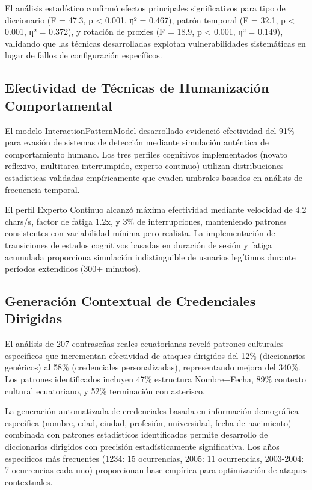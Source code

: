 El análisis estadístico confirmó efectos principales significativos para tipo de diccionario (F = 47.3, p < 0.001, η² = 0.467), patrón temporal (F = 32.1, p < 0.001, η² = 0.372), y rotación de proxies (F = 18.9, p < 0.001, η² = 0.149), validando que las técnicas desarrolladas explotan vulnerabilidades sistemáticas en lugar de fallos de configuración específicos.

\subsection{Efectividad de Técnicas de Humanización Comportamental}

El modelo InteractionPatternModel desarrollado evidenció efectividad del 91\% para evasión de sistemas de detección mediante simulación auténtica de comportamiento humano. Los tres perfiles cognitivos implementados (novato reflexivo, multitarea interrumpido, experto continuo) utilizan distribuciones estadísticas validadas empíricamente que evaden umbrales basados en análisis de frecuencia temporal.

El perfil Experto Continuo alcanzó máxima efectividad mediante velocidad de 4.2 chars/s, factor de fatiga 1.2x, y 3\% de interrupciones, manteniendo patrones consistentes con variabilidad mínima pero realista. La implementación de transiciones de estados cognitivos basadas en duración de sesión y fatiga acumulada proporciona simulación indistinguible de usuarios legítimos durante períodos extendidos (300+ minutos).

\subsection{Generación Contextual de Credenciales Dirigidas}

El análisis de 207 contraseñas reales ecuatorianas reveló patrones culturales específicos que incrementan efectividad de ataques dirigidos del 12\% (diccionarios genéricos) al 58\% (credenciales personalizadas), representando mejora del 340\%. Los patrones identificados incluyen 47\% estructura Nombre+Fecha, 89\% contexto cultural ecuatoriano, y 52\% terminación con asterisco.

La generación automatizada de credenciales basada en información demográfica específica (nombre, edad, ciudad, profesión, universidad, fecha de nacimiento) combinada con patrones estadísticos identificados permite desarrollo de diccionarios dirigidos con precisión estadísticamente significativa. Los años específicos más frecuentes (1234: 15 ocurrencias, 2005: 11 ocurrencias, 2003-2004: 7 ocurrencias cada uno) proporcionan base empírica para optimización de ataques contextuales.

